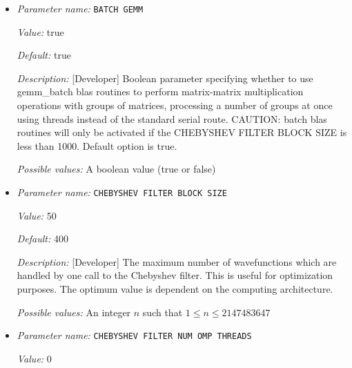 \begin{itemize}
\item {\it Parameter name:} {\tt BATCH GEMM}
\label{parameters:SCF parameters/Eigen_2dsolver_2fChebyshev solver related parameters/BATCH GEMM}
\label{parameters:SCF_20parameters/Eigen_2dsolver_2fChebyshev_20solver_20related_20parameters/BATCH_20GEMM}


{\it Value:} true


{\it Default:} true


{\it Description:} [Developer] Boolean parameter specifying whether to use gemm\_batch blas routines to perform matrix-matrix multiplication operations with groups of matrices, processing a number of groups at once using threads instead of the standard serial route. CAUTION: batch blas routines will only be activated if the CHEBYSHEV FILTER BLOCK SIZE is less than 1000. Default option is true.


{\it Possible values:} A boolean value (true or false)
\item {\it Parameter name:} {\tt CHEBYSHEV FILTER BLOCK SIZE}
\label{parameters:SCF parameters/Eigen_2dsolver_2fChebyshev solver related parameters/CHEBYSHEV FILTER BLOCK SIZE}
\label{parameters:SCF_20parameters/Eigen_2dsolver_2fChebyshev_20solver_20related_20parameters/CHEBYSHEV_20FILTER_20BLOCK_20SIZE}


{\it Value:} 50


{\it Default:} 400


{\it Description:} [Developer] The maximum number of wavefunctions which are handled by one call to the Chebyshev filter. This is useful for optimization purposes. The optimum value is dependent on the computing architecture.


{\it Possible values:} An integer $n$ such that $1\leq n \leq 2147483647$
\item {\it Parameter name:} {\tt CHEBYSHEV FILTER NUM OMP THREADS}
\label{parameters:SCF parameters/Eigen_2dsolver_2fChebyshev solver related parameters/CHEBYSHEV FILTER NUM OMP THREADS}
\label{parameters:SCF_20parameters/Eigen_2dsolver_2fChebyshev_20solver_20related_20parameters/CHEBYSHEV_20FILTER_20NUM_20OMP_20THREADS}


{\it Value:} 0



\end{itemize}
